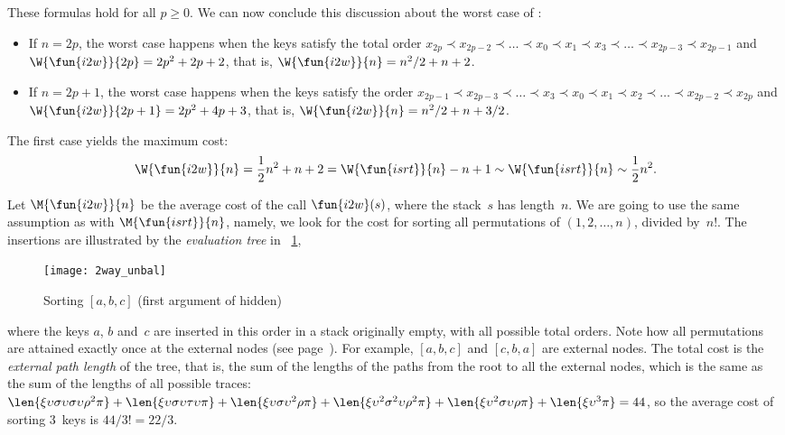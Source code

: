 These formulas hold for all \(p \geqslant 0\). We can now conclude
this discussion about the worst case of :
\begin{itemize}

\item If \(n = 2p\), the worst case happens when the keys satisfy the
  total order \(x_{2p} \prec x_{2p-2} \prec \dots \prec x_0 \prec x_1
  \prec x_3 \prec \dots \prec x_{2p-3} \prec x_{2p-1}\) and
  \(\W{\fun{i2w}}{2p} = 2p^2 + 2p + 2\), that is, \(\W{\fun{i2w}}{n} =
  n^2/2 + n + 2\).

\item If \(n = 2p+1\), the worst case happens when the keys satisfy
  the order \(x_{2p-1} \prec x_{2p-3} \prec \dots \prec x_3 \prec x_0
  \prec x_1 \prec x_2 \prec \dots \prec x_{2p-2} \prec x_{2p}\) and
  \(\W{\fun{i2w}}{2p+1} = 2p^2 + 4p + 3\), that is, \(\W{\fun{i2w}}{n}
  = n^2/2 + n + 3/2\).

\end{itemize}
The first case yields the maximum cost:
\begin{equation*}
\belowdisplayskip=0pt
  \W{\fun{i2w}}{n} = \frac{1}{2}{n^2} + n + 2 = \W{\fun{isrt}}{n} - n
  + 1 \sim
  \W{\fun{isrt}}{n} \sim \frac{1}{2}{n^2}.
\end{equation*}



Let \(\M{\fun{i2w}}{n}\) be the average
cost of the call \(\fun{i2w}(s)\), where the
stack~\(s\) has length~\(n\). We are going to use the same assumption
as with \(\M{\fun{isrt}}{n}\), namely, we look for the cost for
sorting all permutations of \((1,2,\dots,n)\), divided by~\(n!\). The
insertions are illustrated by the \emph{evaluation
  tree} in \fig~\ref{fig:2way_unbal},
\begin{figure}[!b]
\centering
\texttt{[image: 2way\_unbal]}
\caption{Sorting \([a,b,c]\) (first argument of  hidden)}
\label{fig:2way_unbal}
\end{figure}
where the keys \(a\), \(b\) and~\(c\) are inserted in this order in a
stack originally empty, with all possible total orders. Note how all
permutations are attained exactly once at the external
nodes (see
page~\pageref{def:external_node}). For example, \([a,b,c]\) and
\([c,b,a]\) are external nodes. The total cost is the \emph{external
  path length}\label{external_path_length} of the tree, that is, the sum of
the lengths of the paths from the root to all the external nodes,
which is the same as the sum of the lengths of all possible
traces:
\(\len{\xi\upsilon\sigma\upsilon\sigma\upsilon\rho^2\pi} +
\len{\xi\upsilon\sigma\upsilon\tau\upsilon\pi} +
\len{\xi\upsilon\sigma\upsilon^2\rho\pi} +
\len{\xi\upsilon^2\sigma^2\upsilon\rho^2\pi} +
\len{\xi\upsilon^2\sigma\upsilon\rho\pi} + \len{\xi\upsilon^3\pi} =
44\), so the average cost of sorting \(3\)~keys is \(44/3! = 22/3\).

